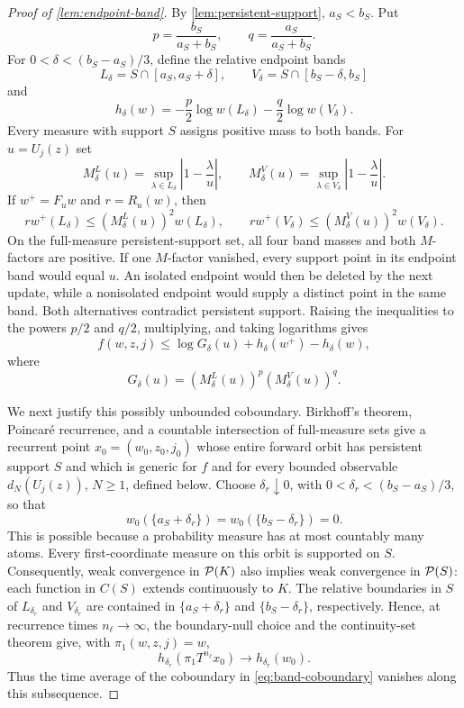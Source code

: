 \documentclass[letterpaper,twoside]{article}
\begin{document}
\begin{proof}[Proof of \cref{lem:endpoint-band}]
By \cref{lem:persistent-support}, $a_S<b_S$.
Put
\[
 p=\frac{b_S}{a_S+b_S},
 \qquad
 q=\frac{a_S}{a_S+b_S}.
\]
For $0<\delta<(b_S-a_S)/3$, define the relative endpoint bands
\[
 L_\delta=S\cap[a_S,a_S+\delta],
 \qquad
 V_\delta=S\cap[b_S-\delta,b_S]
\]
and
\[
 h_\delta(w)
 =-\frac p2\log w(L_\delta)
  -\frac q2\log w(V_\delta).
\]
Every measure with support $S$ assigns positive mass to both bands.  For
$u=U_j(z)$ set
\[
 M^L_\delta(u)=\sup_{\lambda\in L_\delta}
     \left|1-\frac\lambda u\right|,
 \qquad
 M^V_\delta(u)=\sup_{\lambda\in V_\delta}
     \left|1-\frac\lambda u\right|.
\]
If $w^+=F_u w$ and $r=R_u(w)$, then
\[
 rw^+(L_\delta)\le (M^L_\delta(u))^2w(L_\delta),
 \qquad
 rw^+(V_\delta)\le (M^V_\delta(u))^2w(V_\delta).
\]
On the full-measure persistent-support set, all four band masses and both
$M$-factors are positive.  If one $M$-factor vanished, every support point in
its endpoint band would equal $u$.  An isolated endpoint would then be deleted
by the next update, while a nonisolated endpoint would supply a distinct point
in the same band.  Both alternatives contradict persistent support.  Raising
the inequalities to the
powers $p/2$ and $q/2$, multiplying, and taking logarithms gives
\begin{equation}\label{eq:band-coboundary}
 f(w,z,j)
 \le \log G_\delta(u)+h_\delta(w^+)-h_\delta(w),
\end{equation}
where
\[
 G_\delta(u)=
 (M^L_\delta(u))^p(M^V_\delta(u))^q.
\]

We next justify this possibly unbounded coboundary.  Birkhoff's theorem,
Poincar\'e recurrence, and a countable intersection of full-measure sets
\cite{Walters1982} give a recurrent point $x_0=(w_0,z_0,j_0)$ whose entire
forward orbit has persistent support $S$ and which is generic for $f$ and for
every bounded observable $d_N(U_j(z))$, $N\ge1$, defined below.  Choose
$\delta_r\downarrow0$, with
$0<\delta_r<(b_S-a_S)/3$, so that
\[
 w_0(\{a_S+\delta_r\})=w_0(\{b_S-\delta_r\})=0.
\]
This is possible because a probability measure has at most countably many
atoms.  Every first-coordinate measure on this orbit is supported on $S$.
Consequently, weak convergence in $\mathcal P(K)$ also implies weak convergence in
$\mathcal P(S)$: each function in $C(S)$ extends continuously to $K$.  The relative
boundaries in $S$ of $L_{\delta_r}$ and $V_{\delta_r}$ are contained in
$\{a_S+\delta_r\}$ and $\{b_S-\delta_r\}$, respectively.  Hence, at
recurrence times $n_\ell\to\infty$, the boundary-null choice and the
continuity-set theorem give, with $\pi_1(w,z,j)=w$,
\[
 h_{\delta_r}(\pi_1T^{n_\ell}x_0)
 \longrightarrow h_{\delta_r}(w_0).
\]
Thus the time average of the coboundary in
\eqref{eq:band-coboundary} vanishes along this subsequence.


\end{proof}
\end{document}
